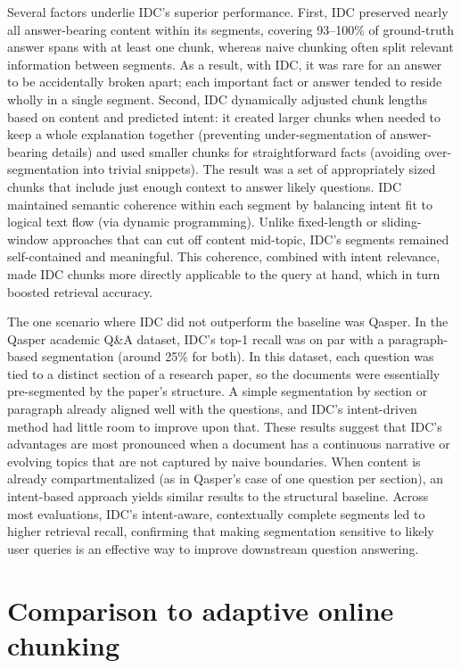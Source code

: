 \documentclass[12pt,a4paper]{report}
\begin{document}
Several factors underlie IDC's superior performance. First, IDC preserved nearly all answer-bearing content within its segments, covering 93--100\% of ground-truth answer spans with at least one chunk, whereas naive chunking often split relevant information between segments. As a result, with IDC, it was rare for an answer to be accidentally broken apart; each important fact or answer tended to reside wholly in a single segment. Second, IDC dynamically adjusted chunk lengths based on content and predicted intent: it created larger chunks when needed to keep a whole explanation together (preventing under-segmentation of answer-bearing details) and used smaller chunks for straightforward facts (avoiding over-segmentation into trivial snippets). The result was a set of appropriately sized chunks that include just enough context to answer likely questions. IDC maintained semantic coherence within each segment by balancing intent fit to logical text flow (via dynamic programming). Unlike fixed-length or sliding-window approaches that can cut off content mid-topic, IDC's segments remained self-contained and meaningful. This coherence, combined with intent relevance, made IDC chunks more directly applicable to the query at hand, which in turn boosted retrieval accuracy.

The one scenario where IDC did not outperform the baseline was Qasper. In the Qasper academic Q\&A dataset, IDC's top-1 recall was on par with a paragraph-based segmentation (around 25\% for both). In this dataset, each question was tied to a distinct section of a research paper, so the documents were essentially pre-segmented by the paper's structure. A simple segmentation by section or paragraph already aligned well with the questions, and IDC's intent-driven method had little room to improve upon that. These results suggest that IDC's advantages are most pronounced when a document has a continuous narrative or evolving topics that are not captured by naive boundaries. When content is already compartmentalized (as in Qasper's case of one question per section), an intent-based approach yields similar results to the structural baseline. Across most evaluations, IDC's intent-aware, contextually complete segments led to higher retrieval recall, confirming that making segmentation sensitive to likely user queries is an effective way to improve downstream question answering.

\section{Comparison to adaptive online chunking}
\end{document}
